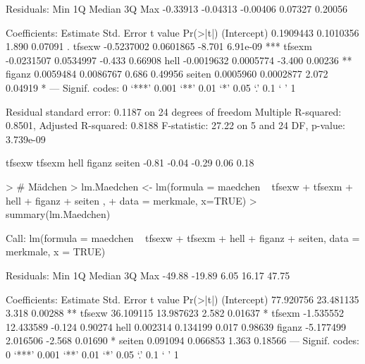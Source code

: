 \begin{Schunk}
\begin{Soutput}
Residuals:
     Min       1Q   Median       3Q      Max 
-0.33913 -0.04313 -0.00406  0.07327  0.20056 

Coefficients:
              Estimate Std. Error t value Pr(>|t|)    
(Intercept)  0.1909443  0.1010356   1.890  0.07091 .  
tfsexw      -0.5237002  0.0601865  -8.701 6.91e-09 ***
tfsexm      -0.0231507  0.0534997  -0.433  0.66908    
hell        -0.0019632  0.0005774  -3.400  0.00236 ** 
figanz       0.0059484  0.0086767   0.686  0.49956    
seiten       0.0005960  0.0002877   2.072  0.04919 *  
---
Signif. codes:  0 ‘***’ 0.001 ‘**’ 0.01 ‘*’ 0.05 ‘.’ 0.1 ‘ ’ 1 

Residual standard error: 0.1187 on 24 degrees of freedom
Multiple R-squared: 0.8501,	Adjusted R-squared: 0.8188 
F-statistic: 27.22 on 5 and 24 DF,  p-value: 3.739e-09 
\end{Soutput}
\begin{Soutput}
tfsexw tfsexm   hell figanz seiten 
 -0.81  -0.04  -0.29   0.06   0.18 
\end{Soutput}
\begin{Sinput}
> # Mädchen
> lm.Maedchen <- lm(formula = maedchen ~ tfsexw + tfsexm + hell +  figanz  +  seiten  , 
+   data = merkmale, x=TRUE)
> summary(lm.Maedchen)
\end{Sinput}
\begin{Soutput}
Call:
lm(formula = maedchen ~ tfsexw + tfsexm + hell + figanz + seiten, 
    data = merkmale, x = TRUE)

Residuals:
   Min     1Q Median     3Q    Max 
-49.88 -19.89   6.05  16.17  47.75 

Coefficients:
             Estimate Std. Error t value Pr(>|t|)   
(Intercept) 77.920756  23.481135   3.318  0.00288 **
tfsexw      36.109115  13.987623   2.582  0.01637 * 
tfsexm      -1.535552  12.433589  -0.124  0.90274   
hell         0.002314   0.134199   0.017  0.98639   
figanz      -5.177499   2.016506  -2.568  0.01690 * 
seiten       0.091094   0.066853   1.363  0.18566   
---
Signif. codes:  0 ‘***’ 0.001 ‘**’ 0.01 ‘*’ 0.05 ‘.’ 0.1 ‘ ’ 1 


\end{Soutput}
\end{Schunk}
